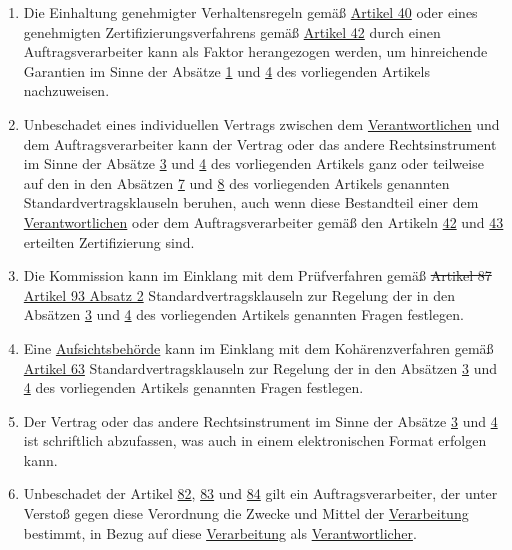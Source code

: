 \begin{enumerate}
  \item Die Einhaltung genehmigter Verhaltensregeln gemäß \hyperref[ch:40]{Artikel 40} oder eines genehmigten
   Zertifizierungsverfahrens gemäß \hyperref[ch:42]{Artikel 42} durch einen Auftragsverarbeiter kann als Faktor
   herangezogen werden, um hinreichende Garantien im Sinne der Absätze \hyperref[itm:28-1]{1} und \hyperref[itm:28-4]
   {4} des vorliegenden Artikels nachzuweisen.
  \label{itm:28-5}

  \item Unbeschadet eines individuellen Vertrags zwischen dem \hyperref[itm:04-7]{Verantwortlichen} und dem Auftragsverarbeiter kann der
   Vertrag oder das andere Rechtsinstrument im Sinne der Absätze \hyperref[itm:28-3-1]{3} und \hyperref[itm:28-4]{4} des
   vorliegenden Artikels ganz oder teilweise auf den in den Absätzen \hyperref[itm:28-7]{7} und \hyperref[itm:28-8]
   {8} des vorliegenden Artikels genannten Standardvertragsklauseln beruhen, auch wenn diese Bestandteil einer dem
   \hyperref[itm:04-7]{Verantwortlichen} oder dem Auftragsverarbeiter gemäß den Artikeln \hyperref[ch:42]{42} und \hyperref[ch:43]{43}
   erteilten Zertifizierung sind.
  \label{itm:28-6}

  \item Die Kommission kann im Einklang mit dem Prüfverfahren gemäß \sout{Artikel 87} \hyperref[itm:93-2]{Artikel 93
   Absatz 2} Standardvertragsklauseln zur Regelung der in den Absätzen \hyperref[itm:28-3-1]{3} und \hyperref[itm:28-4]
   {4} des vorliegenden Artikels genannten Fragen festlegen.
  \label{itm:28-7}

  \item Eine \hyperref[itm:04-21]{Aufsichtsbehörde} kann im Einklang mit dem Kohärenzverfahren gemäß \hyperref[ch:63]{Artikel 63}
   Standardvertragsklauseln zur Regelung der in den Absätzen \hyperref[itm:28-3-1]{3} und \hyperref[itm:28-4]{4} des
   vorliegenden Artikels genannten Fragen festlegen.
  \label{itm:28-8}

  \item Der Vertrag oder das andere Rechtsinstrument im Sinne der Absätze \hyperref[itm:28-3-1]{3} und \hyperref
  [itm:28-4]
   {4} ist schriftlich abzufassen, was auch in einem elektronischen Format erfolgen kann.
  \label{itm:28-9}

  \item Unbeschadet der Artikel \hyperref[ch:82]{82}, \hyperref[ch:83]{83} und \hyperref[ch:84]{84} gilt ein
   Auftragsverarbeiter, der unter Verstoß gegen diese Verordnung die Zwecke und Mittel der \hyperref[itm:04-2]{Verarbeitung} bestimmt, in
   Bezug auf diese \hyperref[itm:04-2]{Verarbeitung} als \hyperref[itm:04-7]{Verantwortlicher}.
  \label{itm:28-10}

\end{enumerate}

